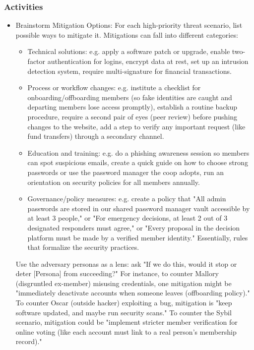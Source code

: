 \subsubsection{Activities}

\begin{itemize}   

    \item Brainstorm Mitigation Options: For each high-priority threat scenario, list possible ways to mitigate
    it. Mitigations can fall into different categories:
        \begin{itemize}   
            \item Technical solutions: e.g. apply a software patch or upgrade, enable two-factor authentication
    for logins, encrypt data at rest, set up an intrusion detection system, require multi-signature for financial
    transactions.
            \item Process or workflow changes: e.g. institute a checklist for onboarding/offboarding members (so
    fake identities are caught and departing members lose access promptly), establish a routine backup procedure,
    require a second pair of eyes (peer review) before pushing changes to the website, add a step to verify any
    important request (like fund transfers) through a secondary channel.
            \item Education and training: e.g. do a phishing awareness session so members can spot suspicious
    emails, create a quick guide on how to choose strong passwords or use the password manager the coop adopts,
    run an orientation on security policies for all members annually.
            \item Governance/policy measures: e.g. create a policy that "All admin passwords are stored in our
    shared password manager vault accessible by at least 3 people," or "For emergency decisions, at least 2 out of
    3 designated responders must agree," or "Every proposal in the decision platform must be made by a verified
    member identity." Essentially, rules that formalize the security practices.
        \end{itemize}
    
    Use the adversary personas as a lens: ask "If we do this, would it stop or deter [Persona] from succeeding?"
    For instance, to counter Mallory (disgruntled ex-member) misusing credentials, one mitigation might be
    "immediately deactivate accounts when someone leaves (offboarding policy)." To counter Oscar (outside hacker)
    exploiting a bug, mitigation is "keep software updated, and maybe run security scans." To counter the Sybil
    scenario, mitigation could be "implement stricter member verification for online voting (like each account
    must link to a real person's membership record)."


\end{itemize}
